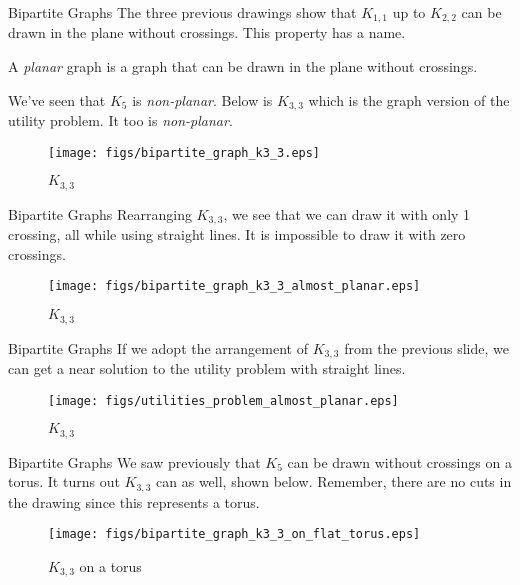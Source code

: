 \documentclass{beamer}
\begin{document}
    \begin{frame}{Bipartite Graphs}
        The three previous drawings show that $K_{1,1}$ up to
        $K_{2,2}$ can be drawn in the plane without crossings.
        This property has a name.
        \begin{definition}
            A \textit{planar} graph is a graph that can be drawn in the
            plane without crossings.
        \end{definition}
        We've seen that $K_{5}$ is \textit{non-planar}. Below is $K_{3,3}$ which
        is the graph version of the utility problem. It too is \textit{non-planar}.
        \begin{figure}
            \centering
            \texttt{[image: figs/bipartite\_graph\_k3\_3.eps]}
            \caption{$K_{3,3}$}
            \label{fig:bipartite_graph_k_3_3}
        \end{figure}
    \end{frame}
    \begin{frame}{Bipartite Graphs}
        Rearranging $K_{3,3}$, we see that we can draw it with only 1 crossing,
        all while using straight lines. It is impossible to draw it with zero
        crossings.
        \begin{figure}
            \centering
            \texttt{[image: figs/bipartite\_graph\_k3\_3\_almost\_planar.eps]}
            \caption{$K_{3,3}$}
            \label{fig:bipartite_graph_k_3_3_almost_planar}
        \end{figure}
    \end{frame}
    \begin{frame}{Bipartite Graphs}
        If we adopt the arrangement of $K_{3,3}$ from the previous slide, we can get a
        near solution to the utility problem with straight lines.
        \begin{figure}
            \centering
            \texttt{[image: figs/utilities\_problem\_almost\_planar.eps]}
            \caption{$K_{3,3}$}
            \label{fig:utility_problem_near_planar}
        \end{figure}
    \end{frame}
    \begin{frame}{Bipartite Graphs}
        We saw previously that $K_{5}$ can be drawn without crossings on a torus.
        It turns out $K_{3,3}$ can as well, shown below. Remember, there are no
        cuts in the drawing since this represents a torus.
        \begin{figure}
            \centering
            \texttt{[image: figs/bipartite\_graph\_k3\_3\_on\_flat\_torus.eps]}
            \caption{$K_{3,3}$ on a torus}
            \label{fig:bipartite_graph_k3_3_on_flat_torus}
        \end{figure}
    \end{frame}
\end{document}
